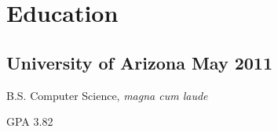 \documentclass[letterpaper]{article}
\renewenvironment{itemize}{
  \begin{list}{}{
    \setlength{\leftmargin}{1.5em}
  }
}{
  \end{list}
}
\begin{document}
\vspace{-30pt}

\section*{\centering Education}
\subsection*{University of Arizona \hfill May 2011}
\begin{itemize}
  \item B.S. Computer Science, \textit{magna cum laude}
  \item GPA 3.82
\end{itemize}



\end{document}
